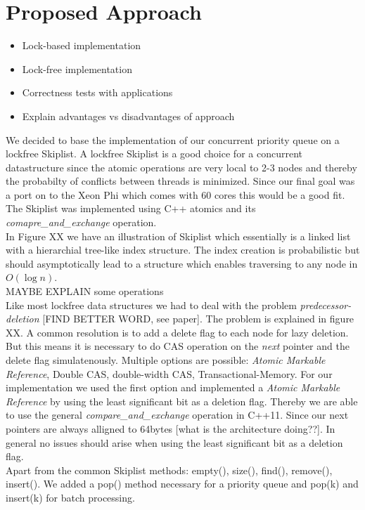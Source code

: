\section{Proposed Approach}\label{sec:approach}


\begin{itemize}
	\item Lock-based implementation
	\item Lock-free implementation
	\item Correctness tests with applications
	\item Explain advantages vs disadvantages of approach
\end{itemize}

We decided to base the implementation of our concurrent priority queue on a lockfree Skiplist. A lockfree Skiplist is a good choice for a concurrent datastructure since the atomic operations are very local to 2-3 nodes and thereby the probabilty of conflicts between threads is minimized. Since our final goal was a port on to the Xeon Phi which comes with 60 cores this would be a good fit.\\
The Skiplist was implemented using C++ atomics and its {\em comapre\_and\_exchange} operation.\\
In Figure XX we have an illustration of Skiplist which essentially is a linked list with a hierarchial tree-like index structure. The index creation is probabilistic but should asymptotically lead to a structure which enables traversing to any node in $O(\log n)$.\\
MAYBE EXPLAIN some operations\\
Like most lockfree data structures we had to deal with the problem {\em predecessor-deletion} [FIND BETTER WORD, see paper]. The problem is explained in figure XX.
A common resolution is to add a delete flag to each node for lazy deletion. But this means it is necessary to do CAS operation on the {\em next} pointer and the delete flag simulatenously. Multiple options are possible: {\em Atomic Markable Reference}, Double CAS, double-width CAS, Transactional-Memory. For our implementation we used the first option and implemented a {\em Atomic Markable Reference} by using the least significant bit as a deletion flag. Thereby we are able to use the general {\em compare\_and\_exchange} operation in C++11. Since our next pointers are always alligned to 64bytes [what is the architecture doing??]. In general no issues should arise when using the least significant bit as a deletion flag.\\
Apart from the common Skiplist methods: empty(), size(), find(), remove(), insert(). We added a pop() method necessary for a priority queue and pop(k) and insert(k) for batch processing.\\


